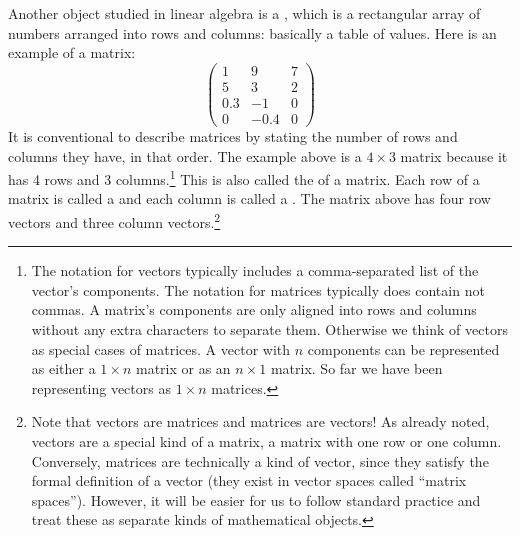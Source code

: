 
   Another object studied in linear algebra is a , which is a 
rectangular array of numbers arranged into rows and columns: basically a table of 
values. Here is an example of a matrix:
\[
\begin{pmatrix}
 1  &   9  & 7 \\
 5  &   3  & 2 \\
0.3 &  -1  & 0 \\
 0  & -0.4 & 0
\end{pmatrix}
\]
It is conventional to describe matrices by stating the number of rows and 
columns they have, in that order. The example above is a $4 \times 3$ 
matrix because it has 4 rows and 3 columns.\footnote{The notation for vectors typically includes a comma-separated list of the vector's components. The notation for matrices typically does contain not commas. A  matrix's components are only aligned into rows and columns without any extra characters to separate them. Otherwise we think of vectors as special cases of matrices. A vector with $n$ components can be represented as either a $1 \times n$ matrix or as an $n \times 1$ matrix. So far we have been representing vectors as $1 \times n$ matrices.} This is also called the  of a matrix.  Each row of a matrix is called a  and each column is called a . The matrix above has four row vectors and 
three column vectors.\footnote{Note that vectors  are matrices and matrices are vectors!  As already noted, vectors are a special kind of a matrix, 
a matrix with one row or one column. Conversely, matrices are technically a 
kind of vector, since they satisfy the formal definition of a vector (they 
exist in vector spaces called ``matrix spaces''). However, it will be easier for us to follow standard practice and treat these as separate kinds of mathematical objects.}  

